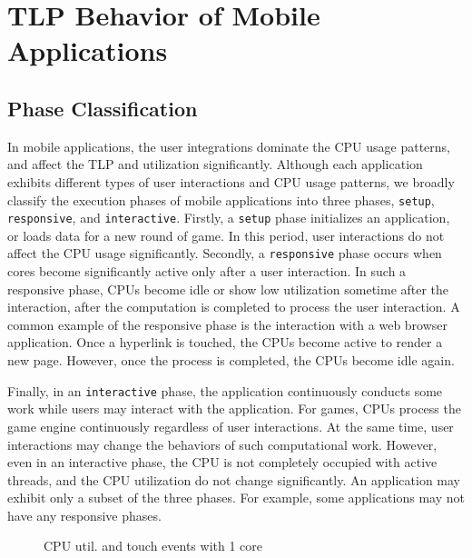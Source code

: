 \section{TLP Behavior of Mobile Applications}

\subsection{Phase Classification}

In mobile applications, the user integrations dominate the CPU usage patterns, and
affect the TLP and utilization significantly. Although each application exhibits
different types of user interactions and CPU usage patterns, we broadly classify
the execution phases of mobile applications into three phases, {\tt setup},
{\tt responsive}, and {\tt interactive}.
Firstly, a {\tt setup} phase initializes an application, or loads data for a new round 
of game. In this period, user interactions do not affect the CPU usage significantly.
Secondly, a {\tt responsive} phase occurs when cores become significantly active only after a user interaction.
In such a responsive phase, CPUs become idle or show low utilization sometime after the interaction, after
the computation is completed to process the user interaction. A common example of
the responsive phase is the interaction with a web browser application. Once
a hyperlink is touched, the CPUs become active to render a new page. However,
once the process is completed, the CPUs become idle again.

Finally, in an {\tt interactive} phase, the application continuously conducts some work
while users may interact with the application. For games, 
CPUs process the game engine continuously regardless of user interactions. At the same time,
user interactions may change the behaviors of such computational work.
However, even in an interactive phase, the CPU is not completely occupied with 
active threads, and the CPU utilization do not change significantly.
An application may exhibit only a subset of the three phases. For example, some applications
may not have any responsive phases.

\begin{figure}[bt]
\begin{center}
\end{center}
\caption{CPU util. and touch events with 1 core}
\label{fig:interact_util_1cpu}
\end{figure}

